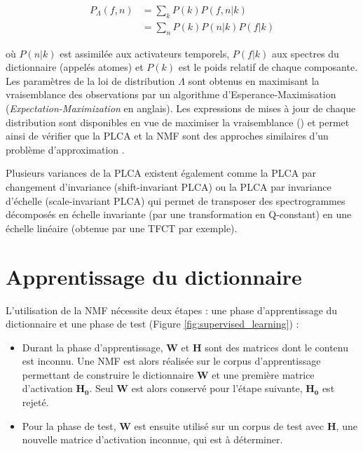 \begin{align}
P_{\Lambda}\left(f,n\right) &= \sum_k P\left( k \right)P\left(f, n\vert k \right)\\
& = \sum_n P(k)P \left(n \vert k\right)P\left(f \vert k \right)
\end{align}

où $P\left( n \vert k \right)$ est assimilée aux activateurs temporels, $P\left(f \vert k \right)$ aux spectres du dictionnaire (appelés atomes) et $P\left(k \right)$ est le poids relatif de chaque composante. Les paramètres de la loi de distribution $\Lambda$ sont obtenus en maximisant la vraisemblance des observations par un algorithme d'{Esperance-Maximisation} (\textit{Expectation-Maximization} en anglais). Les expressions de mises à jour de chaque distribution sont disponibles en vue de maximiser la vraisemblance (\cite{shashanka_probabilistic_2008}) et permet ainsi de vérifier que la PLCA et la NMF sont des approches similaires d'un problème d'approximation \cite{gaussier_relation_2005}.

Plusieurs variances de la PLCA existent également comme la PLCA par changement d'invariance (shift-invariant PLCA) \cite{smaragdis_shift-invariant_2007} ou la PLCA par invariance d'échelle (scale-invariant PLCA) \cite{hennequin_scale-invariant_2011} qui permet de transposer des spectrogrammes décomposés en échelle invariante (par une transformation en Q-constant) en une échelle linéaire (obtenue par une TFCT par exemple). 

\section{Apprentissage du dictionnaire}

L'utilisation de la NMF nécessite deux étapes : une phase d'apprentissage du dictionnaire et une phase de test (Figure \ref{fig:supervised_learning}) : 

\begin{itemize}
\item Durant la phase d'apprentissage, $\mathbf{W}$ et $\mathbf{H}$ sont des matrices dont le contenu est inconnu. Une NMF est alors réalisée sur le corpus d'apprentissage permettant de construire le dictionnaire $\mathbf{W}$ et une première matrice d'activation $\mathbf{H_0}$. Seul $\mathbf{W}$ est alors conservé pour l'étape suivante, $\mathbf{H_0}$ est rejeté.
\item Pour la phase de test, $\mathbf{W}$ est ensuite utilisé sur un corpus de test avec $\mathbf{H}$, une nouvelle matrice d'activation inconnue, qui est à déterminer. 
\end{itemize}

